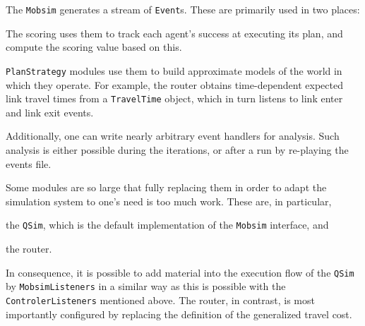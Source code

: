 The \lstinline|Mobsim| generates a stream of \lstinline|Event|s. These are primarily used in two places:
\begin{compactitem}
\item The scoring uses them to track each agent's success at executing its plan, and compute the scoring value based on this.
\item \lstinline|PlanStrategy| modules use them to build approximate models of the world in which they operate.  For example, the router obtains time-dependent expected link travel times from a \lstinline|TravelTime| object, which in turn listens to link enter and link exit events.
  
\end{compactitem}
Additionally, one can write nearly arbitrary event handlers for analysis.
Such analysis is either possible during the iterations, or after a run by re-playing the events file.

Some modules are so large that fully replacing them in order to adapt the simulation system to one's need is too much work. These are, in particular,
\begin{compactitem}
\item the \lstinline|QSim|, which is the default implementation of the \lstinline|Mobsim| interface, and
\item the router.
\end{compactitem}
In consequence, it is possible to add material  into the execution flow of the \lstinline|QSim| by \lstinline|MobsimListeners| in a similar way as this is possible with the \lstinline|ControlerListeners| mentioned above.
%
The router, in contrast, is most importantly configured by replacing the definition of the generalized travel cost. 

